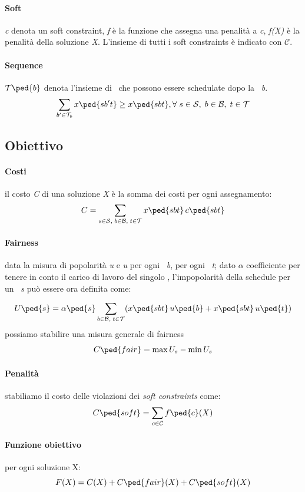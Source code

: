         \paragraph{Soft} \textit{c} denota un soft constraint, \textit{f} è la funzione che assegna una penalità a \textit{c}, \textit{f(X)} è la penalità della soluzione \textit{X}. L'insieme di tutti i soft constraints è indicato con $\mathcal{C}$.
        \paragraph{Sequence} $\mathcal{T}\ped{b}$ denota l'insieme di \ttb\ che possono essere schedulate dopo la \ttb\ \textit{b}. \[\sum_{b'\in \mathcal{T}_b} x\ped{sb't} \ge x\ped{sbt}, \forall \; s \in \mathcal{S},\; b \in \mathcal{B},\; t \in \mathcal{T} \]
    \subsection{Obiettivo}
        \paragraph{Costi} il costo \textit{C} di una soluzione \textit{X} è la somma dei costi per ogni assegnamento: \[C=\sum_{s \in \mathcal{S},\; b \in \mathcal{B},\; t \in \mathcal{T}} x\ped{sbt} \, c\ped{sbt}\]
        \paragraph{Fairness} data la misura di popolarità \textit{u} e \textit{u} per ogni \ttb\ \textit{b}, per ogni \task\ \textit{t}; dato \textit{$\alpha$} coefficiente per tenere in conto il carico di lavoro del singolo \items, l'impopolarità della schedule per un \items\ \textit{s} può essere ora definita come:
        
        \[U\ped{s}=\alpha \ped{s} \sum_{b \in \mathcal{B},\; t \in \mathcal{T}}( x\ped{sbt} \, u\ped{b} + x\ped{sbt} \, u\ped{t})\]
        possiamo stabilire una misura generale di fairness
        \[C\ped{fair}= \max U_s - \min U_s\]
        \paragraph{Penalità} stabiliamo il costo delle violazioni dei \textit{soft constraints} come:
        \[C\ped{soft}= \sum_{c \in \mathcal{C}} f\ped{c}(X)\]
        \paragraph{Funzione obiettivo} per ogni soluzione X:
        \[F(X)= C(X) + C\ped{fair}(X) + C\ped{soft}(X)\]
